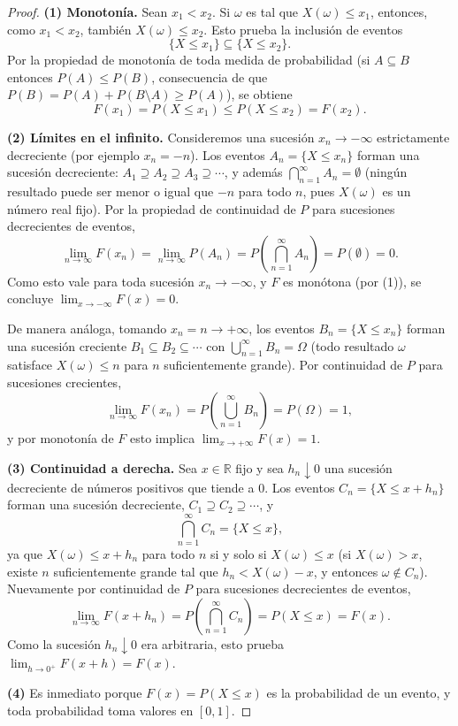 \documentclass[11pt,a4paper]{article}
\theoremstyle{plain}
\theoremstyle{definition}
\theoremstyle{remark}
\begin{document}
\begin{proof}
\textbf{(1) Monotonía.} Sean $x_1<x_2$. Si $\omega$ es tal que $X(\omega)\le x_1$, entonces, como $x_1<x_2$, también $X(\omega)\le x_2$. Esto prueba la inclusión de eventos
$$\{X\le x_1\}\subseteq\{X\le x_2\}.$$
Por la propiedad de monotonía de toda medida de probabilidad (si $A\subseteq B$ entonces $P(A)\le P(B)$, consecuencia de que $P(B)=P(A)+P(B\setminus A)\ge P(A)$), se obtiene
$$F(x_1)=P(X\le x_1)\le P(X\le x_2)=F(x_2).$$

\textbf{(2) Límites en el infinito.} Consideremos una sucesión $x_n\to-\infty$ estrictamente decreciente (por ejemplo $x_n=-n$). Los eventos $A_n=\{X\le x_n\}$ forman una sucesión decreciente: $A_1\supseteq A_2\supseteq A_3\supseteq\cdots$, y además $\bigcap_{n=1}^\infty A_n=\emptyset$ (ningún resultado puede ser menor o igual que $-n$ para todo $n$, pues $X(\omega)$ es un número real fijo). Por la propiedad de continuidad de $P$ para sucesiones decrecientes de eventos,
$$\lim_{n\to\infty}F(x_n)=\lim_{n\to\infty}P(A_n)=P\left(\bigcap_{n=1}^\infty A_n\right)=P(\emptyset)=0.$$
Como esto vale para toda sucesión $x_n\to-\infty$, y $F$ es monótona (por (1)), se concluye $\lim_{x\to-\infty}F(x)=0$.

De manera análoga, tomando $x_n=n\to+\infty$, los eventos $B_n=\{X\le x_n\}$ forman una sucesión creciente $B_1\subseteq B_2\subseteq\cdots$ con $\bigcup_{n=1}^\infty B_n=\Omega$ (todo resultado $\omega$ satisface $X(\omega)\le n$ para $n$ suficientemente grande). Por continuidad de $P$ para sucesiones crecientes,
$$\lim_{n\to\infty}F(x_n)=P\left(\bigcup_{n=1}^\infty B_n\right)=P(\Omega)=1,$$
y por monotonía de $F$ esto implica $\lim_{x\to+\infty}F(x)=1$.

\textbf{(3) Continuidad a derecha.} Sea $x\in\mathbb{R}$ fijo y sea $h_n\downarrow 0$ una sucesión decreciente de números positivos que tiende a $0$. Los eventos $C_n=\{X\le x+h_n\}$ forman una sucesión decreciente, $C_1\supseteq C_2\supseteq\cdots$, y
$$\bigcap_{n=1}^\infty C_n=\{X\le x\},$$
ya que $X(\omega)\le x+h_n$ para todo $n$ si y solo si $X(\omega)\le x$ (si $X(\omega)>x$, existe $n$ suficientemente grande tal que $h_n<X(\omega)-x$, y entonces $\omega\notin C_n$). Nuevamente por continuidad de $P$ para sucesiones decrecientes de eventos,
$$\lim_{n\to\infty}F(x+h_n)=P\left(\bigcap_{n=1}^\infty C_n\right)=P(X\le x)=F(x).$$
Como la sucesión $h_n\downarrow 0$ era arbitraria, esto prueba $\lim_{h\to 0^+}F(x+h)=F(x)$.

\textbf{(4)} Es inmediato porque $F(x)=P(X\le x)$ es la probabilidad de un evento, y toda probabilidad toma valores en $[0,1]$.
\end{proof}
\end{document}
